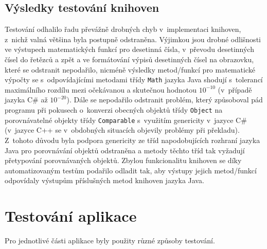 \documentclass[czech,BP]{thesiskiv}
\begin{document}
\subsection{Výsledky testování knihoven}
Testování odhalilo řadu převážně drobných chyb v~implementaci knihoven, z~nichž valná většina byla postupně odstraněna. Výjimkou jsou drobné odlišnosti ve výstupech matematických funkcí pro desetinná čísla, v~převodu desetinných čísel do řetězců a zpět a ve formátování výpisů desetinných čísel na obrazovku, které se odstranit nepodařilo, nicméně výsledky metod/funkcí pro matematické výpočty se s~odpovídajícími metodami třídy \texttt{Math} jazyka Java shodují s~tolerancí maximálního rozdílu mezi očekávanou a skutečnou hodnotou $10^{-10}$ (v~případě jazyka C\# až $10^{-20}$). Dále se nepodařilo odstranit problém, který způsoboval pád programu při pokusech o~konverzi obecných objektů třídy \texttt{Object} na porovnávatelné objekty třídy \texttt{Comparable} s~využitím genericity v~jazyce C\# (v~jazyce C++ se v~obdobných situacích objevily problémy při překladu). Z~tohoto důvodu byla podpora genericity ze tříd napodobujících rozhraní jazyka Java pro porovnávání objektů odstraněna a metody těchto tříd tak vyžadují přetypování porovnávaných objektů. Zbylou funkcionalitu knihoven se díky automatizovaným testům podařilo odladit tak, aby výstupy jejich metod/funkcí odpovídaly výstupům příslušných metod knihoven jazyka Java.

\section{Testování aplikace}
Pro jednotlivé části aplikace byly použity různé způsoby testování.
\end{document}

